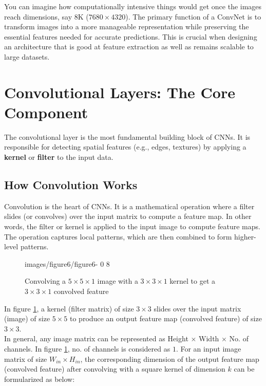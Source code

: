 You can imagine how computationally intensive things would get once the images reach dimensions, say 8K ($7680 \times 4320$). The primary function of a ConvNet is to transform images into a more manageable representation while preserving the essential features needed for accurate predictions. This is crucial when designing an architecture that is good at feature extraction as well as remains scalable to large datasets.

\section{Convolutional Layers: The Core Component}
The convolutional layer is the most fundamental building block of CNNs. It is responsible for detecting spatial features (e.g., edges, textures) by applying a \textbf{kernel} or \textbf{filter} to the input data.

\subsection{How Convolution Works}
Convolution is the heart of CNNs. It is a mathematical operation where a filter slides (or convolves) over the input matrix to compute a feature map. In other words, the filter or kernel is applied to the input image to compute feature maps. The operation captures local patterns, which are then combined to form higher-level patterns.\\

\begin{figure}
    \centering
    {images/figure6/figure6-} %
    {0} %
    {8} %
    \caption{Convolving a $5 \times5 \times1$ image with a $3 \times3 \times1$ kernel to get a $3 \times3 \times1$ convolved feature}
    \label{fig:6}
\end{figure}

In figure \ref{fig:6}, a kernel (filter matrix) of size $3 \times 3$ slides over the input matrix (image) of size $5 \times 5$ to produce an output feature map (convolved feature) of size $3 \times 3$.\\

In general, any image matrix can be represented as Height $\times$ Width $\times$ No. of channels. In figure \ref{fig:6}, no. of channels is considered as $1$.  For an input image matrix of size $W_{in} \times H_{in}$, the corresponding dimension of the output feature map (convolved feature) after convolving with a square kernel of dimension $k$ can be formularized as below:

